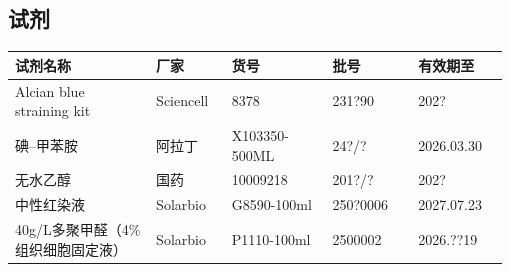 \documentclass[UTF8,10pt,a4paper,fontset=fandol]{ctexart}
\newcommand{\fieldvalue}[1]{#1}
\newcommand{\handwritten}[1]{#1}
\begin{document}
\subsection{试剂}

\begin{center}
\small
\begin{tabular}{|p{0.28\linewidth}|p{0.15\linewidth}|p{0.20\linewidth}|p{0.17\linewidth}|p{0.18\linewidth}|}
\hline
试剂名称 & 厂家 & 货号 & 批号 & 有效期至 \\ \hline
Alcian blue straining kit &
\fieldvalue{Sciencell} &
\fieldvalue{8378} &
\fieldvalue{\handwritten{231?90}} &
\fieldvalue{\handwritten{202?}} \\ \hline
碘--甲苯胺 &
\fieldvalue{阿拉丁} &
\fieldvalue{X103350-500ML} &
\fieldvalue{\handwritten{24?/?}} &
\fieldvalue{\handwritten{2026.03.30}} \\ \hline
无水乙醇 &
\fieldvalue{国药} &
\fieldvalue{10009218} &
\fieldvalue{\handwritten{201?/?}} &
\fieldvalue{\handwritten{202?}} \\ \hline
中性红染液 &
\fieldvalue{Solarbio} &
\fieldvalue{G8590-100ml} &
\fieldvalue{\handwritten{250?0006}} &
\fieldvalue{\handwritten{2027.07.23}} \\ \hline
40g/L多聚甲醛（4\%组织细胞固定液） &
\fieldvalue{Solarbio} &
\fieldvalue{P1110-100ml} &
\fieldvalue{\handwritten{2500002}} &
\fieldvalue{\handwritten{2026.??19}} \\ \hline
\end{tabular}
\end{center}
\end{document}

